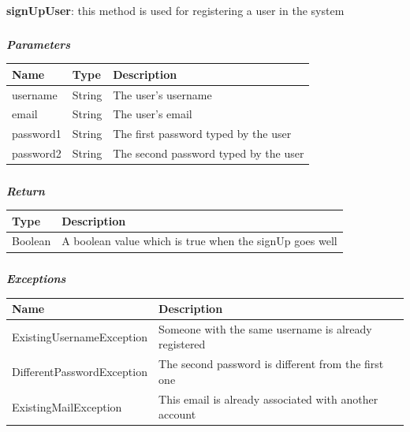 					\paragraph{}
							\textbf{signUpUser}: this method is used for registering a user in the system
							\subparagraph{}
							\textit{\textbf{Parameters}}
								\begin{table}[!h]
									\begin{tabular}{L{0.2\textwidth}L{0.2\textwidth}L{0.2\textwidth}}
										\toprule
										Name & Type & Description \\
										\midrule
								  		username & String & The user's username \\
								  		email & String & The user's email \\
								  		password1 & String & The first password typed by the user \\
								  		password2 & String & The second password typed by the user \\
								 		\bottomrule
									\end{tabular}
								\end{table}
							\subparagraph{}
								\textit{\textbf{Return}}
									\begin{table}[!h]
									\begin{tabular}{L{0.3\textwidth}L{0.3\textwidth}}
										\toprule
										Type & Description \\
										\midrule
								  		Boolean & A boolean value which is true when the signUp goes well \\
								 		\bottomrule
									\end{tabular}
								\end{table}
							\subparagraph{}
								\textit{\textbf{Exceptions}}
									\begin{table}[!h]
									\begin{tabular}{L{0.3\textwidth}L{0.3\textwidth}}
										\toprule
										Name & Description \\
										\midrule
								  		ExistingUsernameException & Someone with the same username is already registered \\
								  		DifferentPasswordException & The second password is different from the first one \\
								  		ExistingMailException & This email is already associated with another account \\
								 		\bottomrule
									\end{tabular}
								\end{table}
							
